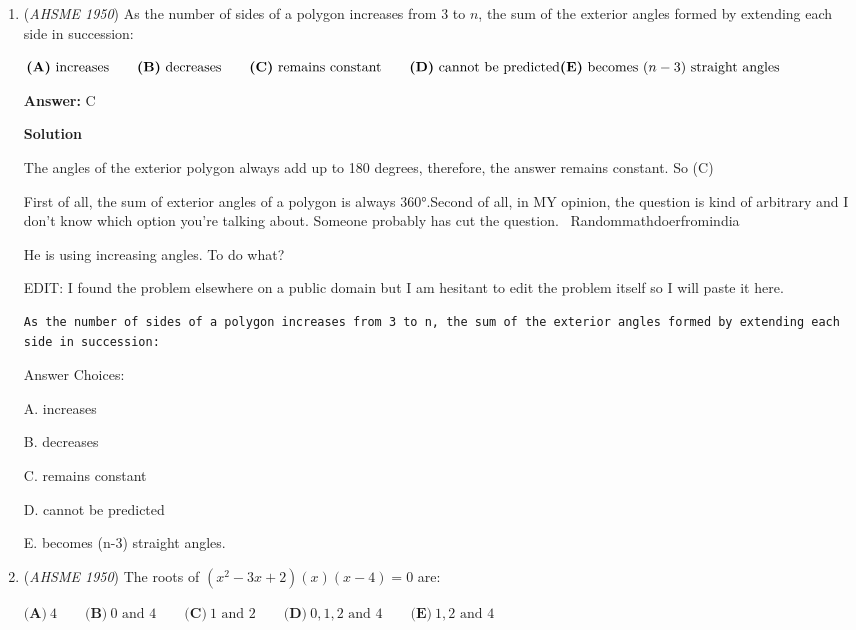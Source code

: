\begin{enumerate}
	\item (\textit{AHSME 1950}) As the number of sides of a polygon increases from $3$ to $n$, the sum of the exterior angles formed by extending each side in succession:


 $\textbf{(A)}\ \text{increases}\qquad\textbf{(B)}\ \text{decreases}\qquad\textbf{(C)}\ \text{remains constant}\qquad\textbf{(D)}\ \text{cannot be predicted}\qquad\\ \textbf{(E)}\ \text{becomes }(n-3)\text{ straight angles}$

 \textbf{Answer: }C



\textbf{Solution}

The angles of the exterior polygon always add up to 180 degrees, therefore, the answer remains constant. So (C)

 


 First of all, the sum of exterior angles of a polygon is always 360°.Second of all, in MY opinion, the question is kind of arbitrary and I don't know which option you're talking about. Someone probably has cut the question.                                                                   ~Randommathdoerfromindia

 He is using increasing angles. To do what?

 


 
EDIT: I found the problem elsewhere on a public domain but I am hesitant to edit the problem itself so I will paste it here.

 \begin{verbatim}
As the number of sides of a polygon increases from 3 to n, the sum of the exterior angles formed by extending each side in succession:
\end{verbatim}

Answer Choices:

 A. increases

 B. decreases

 C. remains constant

 D. cannot be predicted

 E. becomes (n-3) straight angles.

 


	\item (\textit{AHSME 1950}) The roots of $(x^{2}-3x+2)(x)(x-4)=0$ are:


 $\textbf{(A)}\ 4\qquad\textbf{(B)}\ 0\text{ and }4\qquad\textbf{(C)}\ 1\text{ and }2\qquad\textbf{(D)}\ 0,1,2\text{ and }4\qquad\textbf{(E)}\ 1,2\text{ and }4$


\end{enumerate}
